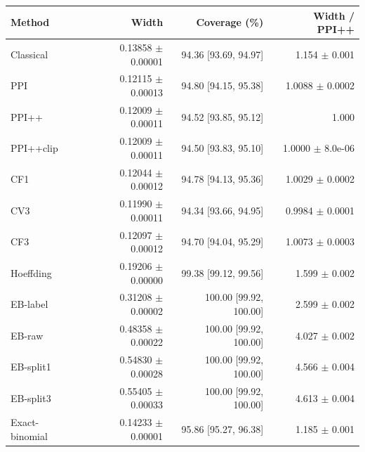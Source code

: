 \small
\begin{tabular}{lrrr}
\toprule
Method & Width & Coverage (\%) & Width / PPI++ \\
\midrule
Classical & 0.13858 $\pm$ 0.00001 & 94.36 [93.69, 94.97] & 1.154 $\pm$ 0.001 \\
PPI & 0.12115 $\pm$ 0.00013 & 94.80 [94.15, 95.38] & 1.0088 $\pm$ 0.0002 \\
PPI++ & 0.12009 $\pm$ 0.00011 & 94.52 [93.85, 95.12] & 1.000 \\
PPI++clip & 0.12009 $\pm$ 0.00011 & 94.50 [93.83, 95.10] & 1.0000 $\pm$ 8.0e-06 \\
CF1 & 0.12044 $\pm$ 0.00012 & 94.78 [94.13, 95.36] & 1.0029 $\pm$ 0.0002 \\
CV3 & 0.11990 $\pm$ 0.00011 & 94.34 [93.66, 94.95] & 0.9984 $\pm$ 0.0001 \\
CF3 & 0.12097 $\pm$ 0.00012 & 94.70 [94.04, 95.29] & 1.0073 $\pm$ 0.0003 \\
Hoeffding & 0.19206 $\pm$ 0.00000 & 99.38 [99.12, 99.56] & 1.599 $\pm$ 0.002 \\
EB-label & 0.31208 $\pm$ 0.00002 & 100.00 [99.92, 100.00] & 2.599 $\pm$ 0.002 \\
EB-raw & 0.48358 $\pm$ 0.00022 & 100.00 [99.92, 100.00] & 4.027 $\pm$ 0.002 \\
EB-split1 & 0.54830 $\pm$ 0.00028 & 100.00 [99.92, 100.00] & 4.566 $\pm$ 0.004 \\
EB-split3 & 0.55405 $\pm$ 0.00033 & 100.00 [99.92, 100.00] & 4.613 $\pm$ 0.004 \\
Exact-binomial & 0.14233 $\pm$ 0.00001 & 95.86 [95.27, 96.38] & 1.185 $\pm$ 0.001 \\
\bottomrule
\end{tabular}

